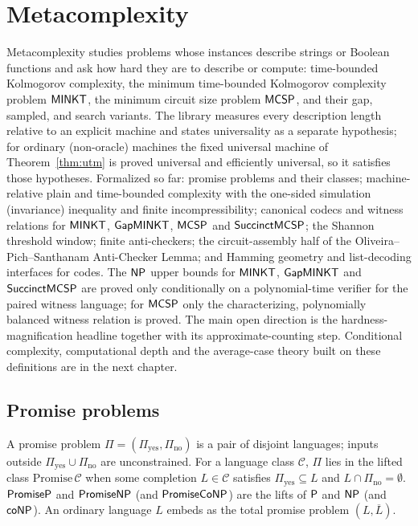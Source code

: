 \chapter{Metacomplexity}
\label{chap:metacomplexity}

Metacomplexity studies problems whose instances describe strings or Boolean
functions and ask how hard they are to describe or compute: time-bounded
Kolmogorov complexity, the minimum time-bounded Kolmogorov complexity problem
$\mathsf{MINKT}$, the minimum circuit size problem $\mathsf{MCSP}$, and their gap,
sampled, and search variants. The library measures every description length
relative to an explicit machine and states universality as a separate
hypothesis; for ordinary (non-oracle) machines the fixed universal machine of
Theorem~\ref{thm:utm} is proved universal and efficiently universal, so it
satisfies those hypotheses. Formalized so far: promise problems and their
classes; machine-relative plain and time-bounded complexity with the one-sided
simulation (invariance) inequality and finite incompressibility; canonical
codecs and witness relations for $\mathsf{MINKT}$, $\mathsf{GapMINKT}$, $\mathsf{MCSP}$
and $\mathsf{SuccinctMCSP}$; the Shannon threshold window; finite anti-checkers;
the circuit-assembly half of the Oliveira--Pich--Santhanam Anti-Checker Lemma;
and Hamming geometry and list-decoding interfaces for codes. The $\mathsf{NP}$
upper bounds for $\mathsf{MINKT}$, $\mathsf{GapMINKT}$ and $\mathsf{SuccinctMCSP}$ are
proved only conditionally on a polynomial-time verifier for the paired witness
language; for $\mathsf{MCSP}$ only the characterizing, polynomially balanced
witness relation is proved. The main open direction is the
hardness-magnification headline together with its approximate-counting step.
Conditional complexity, computational depth and the average-case theory built
on these definitions are in the next chapter.

\section{Promise problems}

\begin{definition}
  \label{def:promise}
  \leanok
  A promise problem $\Pi = (\Pi_{\mathrm{yes}}, \Pi_{\mathrm{no}})$ is a pair
  of disjoint languages; inputs outside $\Pi_{\mathrm{yes}} \cup
  \Pi_{\mathrm{no}}$ are unconstrained. For a language class $\mathcal{C}$,
  $\Pi$ lies in the lifted class $\mathrm{Promise}\,\mathcal{C}$ when some
  completion $L \in \mathcal{C}$ satisfies $\Pi_{\mathrm{yes}} \subseteq L$
  and $L \cap \Pi_{\mathrm{no}} = \emptyset$. $\mathsf{PromiseP}$ and
  $\mathsf{PromiseNP}$ (and $\mathsf{PromiseCoNP}$) are the lifts of $\mathsf{P}$ and
  $\mathsf{NP}$ (and $\mathsf{coNP}$). An ordinary language $L$ embeds as the total
  promise problem $(L, \overline{L})$.
\end{definition}

